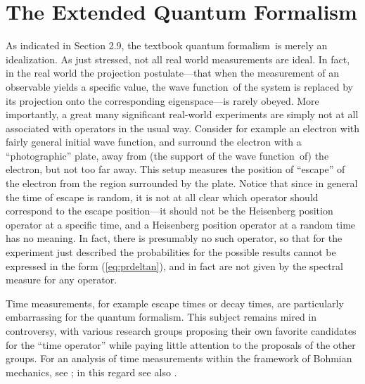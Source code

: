 \documentclass[12pt]{article}
\newcommand{\eq}[1]{(\ref{#1})}
\newcommand{\BM}{Bohmian mechanics}
\newcommand{\qf}{quantum formalism}
\newcommand{\wf}{wave function}
\begin{document}
\section{The Extended Quantum Formalism} \setcounter{equation}{0}

As indicated in Section 2.9, the textbook \qf\ is merely an
idealization.  As just stressed, not all real world measurements are
ideal. In fact, in the real world the projection postulate---that when
the measurement of an observable yields a specific value, the \wf\ of
the system is replaced by its projection onto the corresponding
eigenspace---is rarely obeyed.  More importantly, a great many
significant real-world experiments are simply not at all associated
with operators in the usual way.  Consider for example an electron
with fairly general initial \wf, and surround the electron with a
``photographic'' plate, away {}from (the support of the \wf\ of) the
electron, but not too far away.  This setup measures the position of
``escape'' of the electron {}from the region surrounded by the plate.
Notice that since in general the time of escape is random, it is not
at all clear which operator should correspond to the escape
position---it should not be the Heisenberg position operator at a
specific time, and a Heisenberg position operator at a random time has
no meaning.  In fact, there is presumably no such operator, so that
for the experiment just described the probabilities for the possible
results cannot be expressed in the form \eq{eq:prdeltan}, and in fact
are not given by the spectral measure for any operator.

Time measurements, for example escape times or decay times, are
particularly embarrassing for the \qf.  This subject remains mired in
controversy, with various research groups proposing their own favorite
candidates for the ``time operator'' while paying little attention to
the proposals of the other groups.  For an analysis of time
measurements within the framework of \BM, see \cite{dau97}; in this
regard see also \cite{Lea90, leavens2, leavens3, grubl}.
\end{document}
